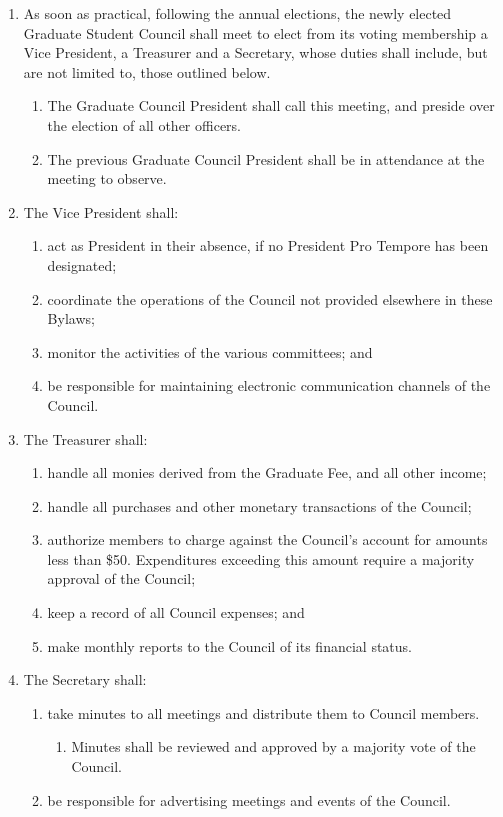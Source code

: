 \documentclass{uniondoc}
\begin{document}

\begin{enumerate}
\item As soon as practical, following the annual elections, the newly elected Graduate Student Council shall meet to elect from its voting membership a Vice President, a Treasurer and a Secretary, whose duties shall include, but are not limited to, those outlined below.
  \begin{enumerate}
  \item The Graduate Council President shall call this meeting, and preside over the election of all other officers.
  \item The previous Graduate Council President shall be in attendance at the meeting to observe.
  \end{enumerate}
\item The Vice President shall:
  \begin{enumerate}
  \item act as President in their absence, if no President Pro Tempore has been designated;
  \item coordinate the operations of the Council not provided elsewhere in these Bylaws;
  \item monitor the activities of the various committees; and
  \item be responsible for maintaining electronic communication channels of the Council.
  \end{enumerate}
\item The Treasurer shall:
  \begin{enumerate}
  \item handle all monies derived from the Graduate Fee, and all other income;
  \item handle all purchases and other monetary transactions of the Council;
  \item authorize members to charge against the Council's account for amounts less than \$50. Expenditures exceeding this amount require a majority approval of the Council;
  \item keep a record of all Council expenses; and
  \item make monthly reports to the Council of its financial status.
  \end{enumerate}
\item The Secretary shall:
  \begin{enumerate}
  \item take minutes to all meetings and distribute them to Council members.
    \begin{enumerate}
    \item Minutes shall be reviewed and approved by a majority vote of the Council.
    \end{enumerate}
  \item be responsible for advertising meetings and events of the Council.
  \end{enumerate}
\end{enumerate}
\end{document}
